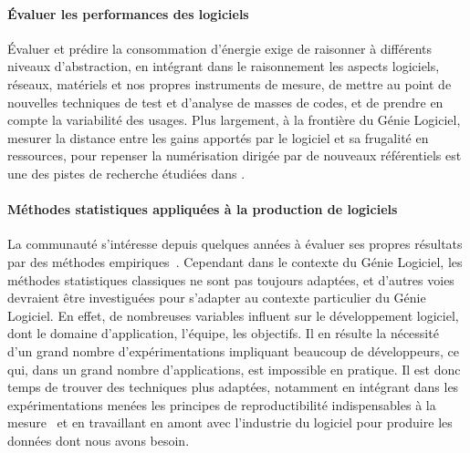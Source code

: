 \documentclass[11pt]{article}
\newcommand{\GL}[0]{Génie Logiciel\xspace}
\newcommand{\defi}[1]{\cite[défi]{#1}}
\begin{document}
 \paragraph{Évaluer les performances des logiciels}
Évaluer et prédire la consommation d'énergie  exige de raisonner à différents niveaux d'abstraction, en intégrant dans le raisonnement les aspects logiciels, réseaux, matériels et nos propres instruments de mesure, de mettre au point de nouvelles techniques de test et d'analyse de masses de codes, et de prendre en compte la variabilité des usages. Plus largement, à la frontière du \GL,  mesurer la distance entre les gains apportés par le logiciel et sa frugalité en ressources, pour repenser la numérisation dirigée par de nouveaux référentiels est une des pistes de recherche étudiées dans \defi{vert}.


\paragraph{Méthodes statistiques appliquées à la production de logiciels}
La communauté s'intéresse depuis quelques années à évaluer ses propres résultats par des méthodes empiriques~\cite{yu2019characterizing}. Cependant dans le contexte du \GL, les méthodes statistiques classiques ne sont pas toujours adaptées, et d'autres voies devraient être investiguées pour s'adapter au contexte particulier du \GL. En effet, de nombreuses variables influent sur le développement logiciel, dont le domaine d'application, l'équipe, les objectifs. 
Il en résulte la nécessité d'un grand nombre d'expérimentations impliquant beaucoup de développeurs, ce qui, dans un grand nombre d'applications, est impossible en pratique. Il est donc temps de trouver des techniques plus adaptées, notamment en intégrant dans les expérimentations menées les principes de reproductibilité indispensables à la mesure~\defi{GLE} et en travaillant en amont avec l'industrie du logiciel pour produire les données dont nous avons besoin.
\end{document}

